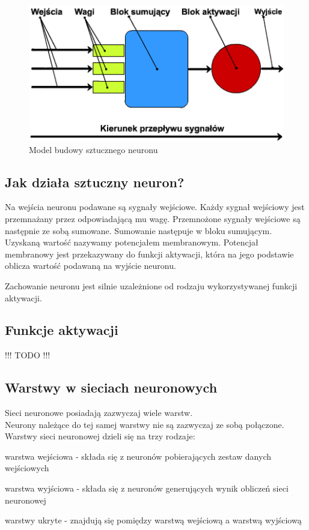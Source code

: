 \vspace{1cm}
\begin{figure}[h]
\begin{center}
\includegraphics[width=15cm]{resources/figures/artificial_neuron.png}
\caption{Model budowy sztucznego neuronu}
\end{center}
\end{figure}
\label{SztucznyNeuronRys}

\subsection{Jak działa sztuczny neuron?}
Na wejścia neuronu podawane są sygnały wejściowe. Każdy sygnał wejściowy
jest przemnażany przez odpowiadającą mu wagę.
Przemnożone sygnały wejściowe są następnie ze sobą sumowane.
Sumowanie następuje w bloku sumującym.
Uzyskaną wartość nazywamy potencjałem membranowym.
Potencjał membranowy jest przekazywany do funkcji aktywacji, która na jego
podstawie oblicza wartość podawaną na wyjście neuronu.

Zachowanie neuronu jest silnie uzależnione od rodzaju wykorzystywanej funkcji
aktywacji.

\subsection{Funkcje aktywacji}
\begin{large}
!!! TODO !!!
\end{large}

\subsection{Warstwy w sieciach neuronowych}
Sieci neuronowe posiadają zazwyczaj wiele warstw. \\
Neurony należące do tej samej warstwy nie są zazwyczaj ze sobą połączone.
Warstwy sieci neuronowej dzieli się na trzy rodzaje:
\begin{itemize*}
\item warstwa wejściowa - składa się z neuronów pobierających zestaw danych
wejściowych
\item warstwa wyjściowa - składa się z neuronów generujących wynik obliczeń
sieci neuronowej
\item warstwy ukryte - znajdują się pomiędzy warstwą wejściową a warstwą wyjściową
\end{itemize*}

